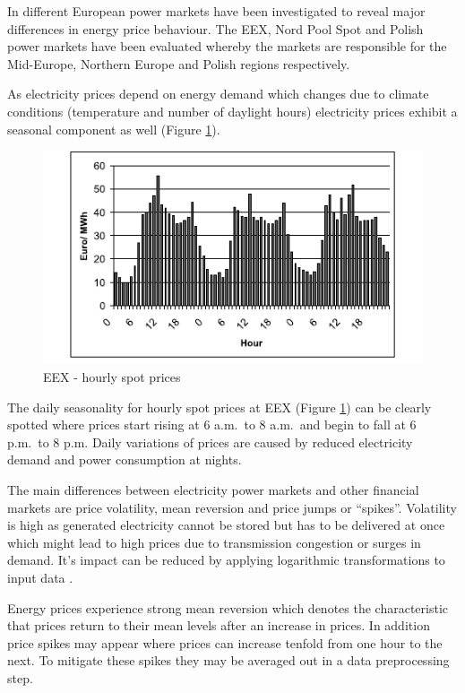 In \cite{mugele2005stable} different European power markets have been investigated to reveal major differences in energy price behaviour. The EEX, Nord Pool Spot and Polish power markets have been evaluated whereby the markets are responsible for the Mid-Europe, Northern Europe and Polish regions respectively. 

As electricity prices depend on energy demand \cite{weron2005forecasting} which changes due to climate conditions (temperature and number of daylight hours) electricity prices exhibit a seasonal component as well (Figure \ref{fig:seasonal_behaviour_of_eex_prices}). 

\begin{figure}[htbp]
	\centering
		\includegraphics{figures/state_of_the_art/seasonal_behaviour_of_eex_prices.PNG}
	\caption{EEX - hourly spot prices \cite{mugele2005stable}}
	\label{fig:seasonal_behaviour_of_eex_prices}
\end{figure}

The daily seasonality for hourly spot prices at EEX (Figure \ref{fig:seasonal_behaviour_of_eex_prices}) can be clearly spotted where prices 
start rising at 6 a.m.~to 8 a.m.~and begin to fall at 6 p.m.~to 8 p.m. Daily variations of prices are caused by reduced electricity demand and power consumption at nights. 

The main differences between electricity power markets and other financial markets are price volatility, mean reversion and price jumps or "`spikes"'. Volatility is high as generated electricity cannot be stored but has to be delivered at once which might lead to high prices due to transmission congestion or surges in demand. It's impact can be reduced by applying logarithmic transformations to input data \cite{weron2005forecasting}. 

Energy prices experience strong mean reversion which denotes the characteristic that prices return to their mean levels after an increase in prices. In addition price spikes may appear where prices can increase tenfold from one hour to the next. To mitigate these spikes they may be averaged out in a data preprocessing step. 

